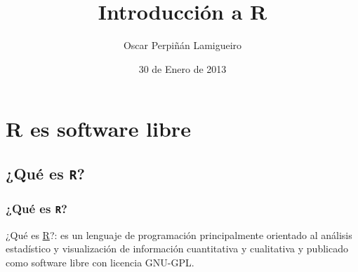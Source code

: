 \documentclass[xcolor={usenames,svgnames,dvipsnames}]{beamer}
\title{Introducción a R}
\author{Oscar Perpiñán Lamigueiro}
\date{30 de Enero de 2013}
\begin{document}
\maketitle


\section{R es software libre}
\label{sec-1}
\subsection{¿Qué es \texttt{R}?}
\label{sec-1-1}
\begin{frame}
\frametitle{¿Qué es \texttt{R}?}
\label{sec-1-1-1}

¿Qué es \href{http://procomun.wordpress.com/2011/02/23/que-es-r/}{R}?: es un lenguaje de programación principalmente
orientado al análisis estadístico y visualización de información
cuantitativa y cualitativa y publicado como software libre con
licencia GNU-GPL.
\end{frame}
\end{document}
